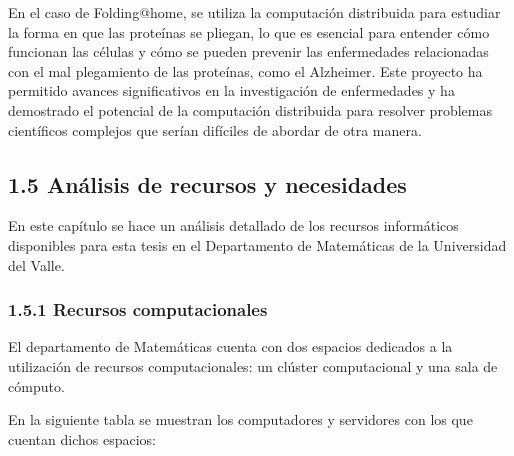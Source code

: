 \begin{spacing}{1.5}
  En el caso de Folding@home, se utiliza la computación distribuida para estudiar la forma en que las proteínas se pliegan, lo que es esencial para entender cómo funcionan las células y cómo se pueden prevenir las enfermedades relacionadas con el mal plegamiento de las proteínas, como el Alzheimer. Este proyecto ha permitido avances significativos en la investigación de enfermedades y ha demostrado el potencial de la computación distribuida para resolver problemas científicos complejos que serían difíciles de abordar de otra manera. \cite{Folding@home-1}\subsection{1.5 Análisis de recursos y necesidades}
  En este capítulo se hace un análisis detallado de los recursos informáticos disponibles para esta tesis en el Departamento de Matemáticas de la Universidad del Valle.

  \subsubsection{1.5.1 Recursos computacionales}
  El departamento de Matemáticas cuenta con dos espacios dedicados a la utilización de recursos computacionales: un clúster computacional y una sala de cómputo.

  En la siguiente tabla se muestran los computadores y servidores con los que cuentan dichos espacios:
  \vspace{3mm}


\end{spacing}
